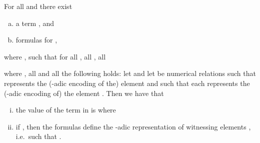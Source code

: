 \documentclass[a4paper,UKenglish]{lipics}
\theoremstyle{plain}
\begin{document}
\begin{lemma}\label{lemma:counting:realisations:sgn}
  For all  and  there exist
 \begin{enumerate}[(a)]
  \item a term , and
  \item formulas  for ,
 \end{enumerate}
where , such that for all , all , all 
 
where , all  and all  the following holds: let  and let  be numerical relations such that  represents the 
(-adic 
encoding of the) element  and such that each  
represents 
the  (-adic encoding of) the element . Then we have that
 \begin{enumerate}[(i)]
  \item the value  of the 
term  in  is  where 

 \item if , then the formulas  define the -adic representation of witnessing elements , i.e.\ such that .
\end{enumerate}

\end{lemma}
\end{document}

